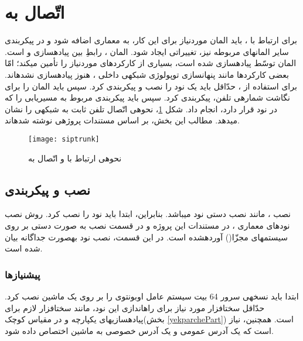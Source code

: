 \section{اتّصال  به }

برای ارتباط  با ، باید المان موردنیاز برای این کار، به معماری  اضافه شود و در پیکربندی سایر المان\nf های مربوطه نیز، تغییراتی ایجاد شود. المان ، رابطِ بین پیاده\nf سازی  و  است. المان 
توسّط  پیاده\nf سازی شده است، بسیاری از کارکردهای موردنیاز را تأمین می\nf کند؛ امّا بعضی کارکردها مانند پنهان\nf سازی توپولوژی شبکه\nf ی داخلی ، هنوز پیاده\nf سازی نشده\nf اند. برای استفاده از ، حدّاقل باید یک نود  را نصب و پیکربندی کرد. سپس باید المان  را برای نگاشت شماره\nf ی تلفن، پیکربندی کرد. سپس باید پیکربندی مربوط به مسیریابی  را که در نود  قرار دارد، انجام داد. شکل \ref{siptrunk}، نحوه\nf ی اتّصال تلفن ثابت به شبکه\nf ی  را نشان می\nf دهد. مطالب این بخش، بر اساس مستندات پروژه\nf ی \cite{webcw} نوشته شده\nf اند.

\begin{figure}[h]
\centering
\texttt{[image: siptrunk]}
\caption{نحوه\nf ی ارتباط  با  و اتّصال به }
\label{siptrunk}
\end{figure}

\subsection{نصب و پیکربندی }
نصب ، مانند نصب دستی نود  می\nf باشد. بنابراین، ابتدا باید نود  را نصب کرد. روش نصب نودهای معماری ، در مستندات این پروژه و در قسمت نصب به صورت دستی بر روی سیستم\nf های مجزّا() آورده\nf شده است. در این قسمت، نصب نود  به\nf صورت جداگانه بیان شده است.
\subsubsection{پیش\nf نیازها}
ابتدا باید نسخه\nf ی سرور 64 بیت سیستم عامل اوبونتوی  را بر روی یک ماشین نصب کرد. حدّاقل سخت\nf افزار مورد نیاز برای راه\nf اندازی این نود، مانند سخت\nf افزار لازم برای پیاده\nf سازی\nf های یکپارچه و در مقیاس کوچک(بخش \ref{yekparchePart}) است. همچنین، نیاز است که یک آدرس  عمومی و یک آدرس  خصوصی به ماشین اختصاص داده شود. 

